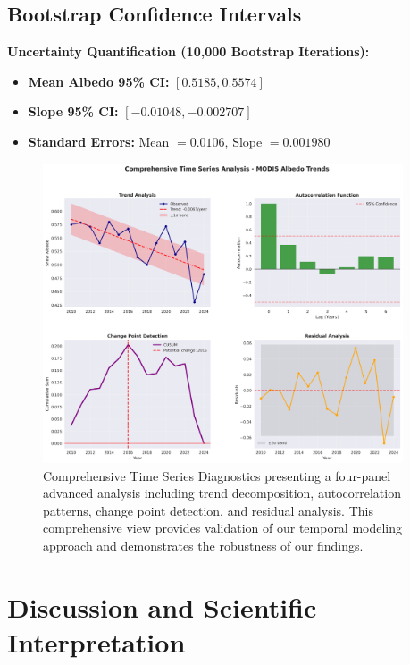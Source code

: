 \documentclass[12pt,a4paper]{article}
\begin{document}
\subsection{Bootstrap Confidence Intervals}

\textbf{Uncertainty Quantification (10,000 Bootstrap Iterations):}
\begin{itemize}
    \item \textbf{Mean Albedo 95\% CI:} $[0.5185, 0.5574]$
    \item \textbf{Slope 95\% CI:} $[-0.01048, -0.002707]$
    \item \textbf{Standard Errors:} Mean $= 0.0106$, Slope $= 0.001980$
\end{itemize}

\begin{figure}[H]
\centering
\includegraphics[width=0.95\textwidth]{../../results/advanced_plots/comprehensive_time_series.png}
\caption{Comprehensive Time Series Diagnostics presenting a four-panel advanced analysis including trend decomposition, autocorrelation patterns, change point detection, and residual analysis. This comprehensive view provides validation of our temporal modeling approach and demonstrates the robustness of our findings.}
\label{fig:comprehensive_diagnostics}
\end{figure}

\section{Discussion and Scientific Interpretation}
\end{document}
